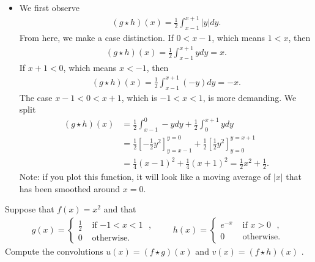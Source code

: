 \documentclass[11pt]{article}
\begin{document}
\begin{solution}
\begin{itemize}
        \item 
        We first observe 
        \begin{align}
            ( g \star h )(x) = \frac 1 2 \int_{x-1}^{x+1} |y| dy.
        \end{align}
        From here, we make a case distinction. 
        If $0 < x-1$, which means $1 < x$, then 
        \begin{align}
            ( g \star h )(x) =   \frac 1 2 \int_{x-1}^{x+1}    y dy =  x.
        \end{align}
        If $x+1 < 0$, which means $x < -1$, then 
        \begin{align}
            ( g \star h )(x) =   \frac 1 2 \int_{x-1}^{x+1} (-y) dy = -x.
        \end{align}
        The case $x-1 < 0 < x+1$, which is $-1 < x < 1$, is more demanding. We split 
        \begin{align}
            ( g \star h )(x) 
            &= 
            \frac 1 2 \int_{x-1}^{  0} -y dy
            +
            \frac 1 2 \int_{  0}^{x+1}  y dy
            \\&
            =
            \frac 1 2 \left[ -\frac 1 2 y^{2}\right]_{y=x-1}^{y=  0}
            +
            \frac 1 2 \left[  \frac 1 2 y^{2}\right]_{y=  0}^{y=x+1}
            \\&
            =
            \frac 1 4 (x-1)^{2} 
            +
            \frac 1 4 (x+1)^{2} 
            =
            \frac 1 2 x^2 + \frac 1 2
            .
        \end{align}
        Note: if you plot this function, it will look like a moving average of $|x|$ that has been smoothed around $x=0$.
    \end{itemize}
\end{solution}



\begin{exercise}
    Suppose that $f(x) = x^2$ and that
    \begin{align*}
        g(x) = \left\{\begin{array}{cc} \frac 1 2 & \text{ if $-1 < x < 1$ }, \\ 0 & \text{ otherwise. } \end{array}\right.
        \qquad 
        h(x) = \left\{\begin{array}{cc} e^{-x} & \text{ if $x > 0$ }, \\ 0 & \text{ otherwise. } \end{array}\right.
    \end{align*}
    Compute the convolutions $u(x) = (f \star g)(x)$ and $v(x) = (f \star h)(x)$ .
\end{exercise}
\end{document}
